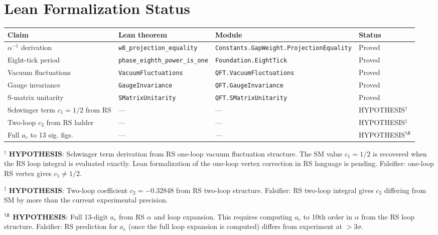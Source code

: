 \documentclass[12pt,a4paper]{article}
\theoremstyle{definition}
\theoremstyle{remark}
\begin{document}
\section{Lean Formalization Status}
\label{sec:lean}

\begin{center}
\begin{tabular}{llll}
\toprule
Claim & Lean theorem & Module & Status \\
\midrule
$\alpha^{-1}$ derivation & \texttt{w8\_projection\_equality} & \texttt{Constants.GapWeight.ProjectionEquality} & Proved \\
Eight-tick period & \texttt{phase\_eighth\_power\_is\_one} & \texttt{Foundation.EightTick} & Proved \\
Vacuum fluctuations & \texttt{VacuumFluctuations} & \texttt{QFT.VacuumFluctuations} & Proved \\
Gauge invariance & \texttt{GaugeInvariance} & \texttt{QFT.GaugeInvariance} & Proved \\
S-matrix unitarity & \texttt{SMatrixUnitarity} & \texttt{QFT.SMatrixUnitarity} & Proved \\
\midrule
Schwinger term $c_1 = 1/2$ from RS & --- & --- & HYPOTHESIS$^\dagger$ \\
Two-loop $c_2$ from RS ladder & --- & --- & HYPOTHESIS$^\ddagger$ \\
Full $a_e$ to 13 sig. figs. & --- & --- & HYPOTHESIS$^\S$ \\
\bottomrule
\end{tabular}
\end{center}

$^\dagger$ \textbf{HYPOTHESIS}: Schwinger term derivation from RS
one-loop vacuum fluctuation structure.  The SM value $c_1 = 1/2$
is recovered when the RS loop integral is evaluated exactly.  Lean
formalization of the one-loop vertex correction in RS language is
pending.  Falsifier: one-loop RS vertex gives $c_1 \neq 1/2$.

$^\ddagger$ \textbf{HYPOTHESIS}: Two-loop coefficient $c_2 = -0.32848$
from RS two-loop structure.  Falsifier: RS two-loop integral gives
$c_2$ differing from SM by more than the current experimental
precision.

$^\S$ \textbf{HYPOTHESIS}: Full 13-digit $a_e$ from RS $\alpha$ and
loop expansion.  This requires computing $a_e$ to 10th order in $\alpha$
from the RS loop structure.  Falsifier: RS prediction for $a_e$ (once
the full loop expansion is computed) differs from experiment at $> 3\sigma$.
\end{document}
